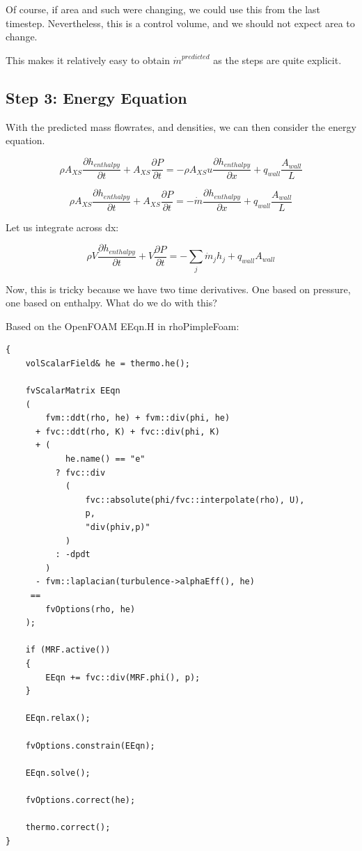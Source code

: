 \documentclass[masters]{ucbthesis}
\renewcommand{\_}{\kern-1.5pt\textunderscore\kern-1.5pt}
\begin{document}
Of course, if area and such were changing, we could use this from the last 
timestep. Nevertheless, this is a control volume, and we should not 
expect area to change. 

This makes it relatively easy to obtain $\dot{m}^{predicted}$ as the steps 
are quite explicit.

\subsection{Step 3: Energy Equation}

With the predicted mass flowrates, and densities, we can then
consider the energy equation.

\begin{equation*} 
	\rho A_{XS} \frac{\partial h_{enthalpy}}{\partial t} 
	+ A_{XS} \frac{\partial P}{\partial t} = 
	- \rho A_{XS} u \frac{\partial h_{enthalpy}}{\partial x}
	+ q_{wall} \frac{A_{wall}}{L}
\end{equation*}


\begin{equation*} 
	\rho A_{XS} \frac{\partial h_{enthalpy}}{\partial t} 
	+ A_{XS} \frac{\partial P}{\partial t} = 
	- \dot{m} \frac{\partial h_{enthalpy}}{\partial x}
	+ q_{wall} \frac{A_{wall}}{L}
\end{equation*}


Let us integrate across dx:

\begin{equation*} 
	\rho V \frac{\partial h_{enthalpy}}{\partial t} 
	+ V \frac{\partial P}{\partial t} = 
	- \sum_j \dot{m}_j h_j
	+ q_{wall} A_{wall}
\end{equation*}

Now, this is tricky because we have two time derivatives. 
One based on pressure, one based on enthalpy. What do we do with this?

Based on the OpenFOAM EEqn.H in rhoPimpleFoam:

\begin{lstlisting}
{
    volScalarField& he = thermo.he();

    fvScalarMatrix EEqn
    (
        fvm::ddt(rho, he) + fvm::div(phi, he)
      + fvc::ddt(rho, K) + fvc::div(phi, K)
      + (
            he.name() == "e"
          ? fvc::div
            (
                fvc::absolute(phi/fvc::interpolate(rho), U),
                p,
                "div(phiv,p)"
            )
          : -dpdt
        )
      - fvm::laplacian(turbulence->alphaEff(), he)
     ==
        fvOptions(rho, he)
    );

    if (MRF.active())
    {
        EEqn += fvc::div(MRF.phi(), p);
    }

    EEqn.relax();

    fvOptions.constrain(EEqn);

    EEqn.solve();

    fvOptions.correct(he);

    thermo.correct();
}
\end{lstlisting}
\end{document}
